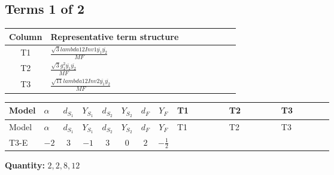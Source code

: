 \documentclass[8pt]{article}
\begin{document}
\begin{landscape}
\subsection*{Terms 1 of 2}
\begin{center}
\begin{tabular}{@{}c >{\raggedright\arraybackslash}p{0.82\linewidth}@{}}
\toprule
Column & Representative term structure \\
\midrule
T1 & \(\displaystyle \frac{\sqrt{3} lambda12Inv1 \overline{y_{1}} \overline{y_{2}}}{MF}\) \\
\midrule
T2 & \(\displaystyle \frac{\sqrt{3} g_{1}^{2} \overline{y_{1}} \overline{y_{2}}}{MF}\) \\
\midrule
T3 & \(\displaystyle \frac{\sqrt{11} lambda12Inv2 \overline{y_{1}} \overline{y_{2}}}{MF}\) \\
\midrule
\bottomrule
\end{tabular}
\end{center}
\smallskip
\tiny
\begin{longtable}{@{}llcccccc >{\raggedright\arraybackslash}p{0.21\linewidth} >{\raggedright\arraybackslash}p{0.21\linewidth} >{\raggedright\arraybackslash}p{0.21\linewidth}@{}}
\toprule
Model & $\alpha$ & $d_{S_1}$ & $Y_{S_1}$ & $d_{S_2}$ & $Y_{S_2}$ & $d_F$ & $Y_F$ & T1 & T2 & T3 \\
\midrule
\endfirsthead
\toprule
Model & $\alpha$ & $d_{S_1}$ & $Y_{S_1}$ & $d_{S_2}$ & $Y_{S_2}$ & $d_F$ & $Y_F$ & T1 & T2 & T3 \\
\midrule
\endhead
T3-E & $-2$ & $3$ & $-1$ & $3$ & $0$ & $2$ & $-\frac{1}{2}$ & \scriptsize\adjustbox{max width=\linewidth}{$\begin{gathered} - \frac{\sqrt{3} lambda12Inv1 \overline{y_{1}} \overline{y_{2}}}{6 MF}\end{gathered}$} & \scriptsize\adjustbox{max width=\linewidth}{$\begin{gathered} \frac{\sqrt{3} g_{1}^{2} \overline{y_{1}} \overline{y_{2}}}{8 MF}\end{gathered}$} & \scriptsize\adjustbox{max width=\linewidth}{$\begin{gathered} \frac{3 \sqrt{11} lambda12Inv2 \overline{y_{1}} \overline{y_{2}}}{22 MF}\end{gathered}$} \\
\midrule
\bottomrule
\end{longtable}
\clearpage
\noindent\textbf{Quantity: }$\mathrm{2,2,8,12}$\par\smallskip

\end{landscape}
\end{document}
